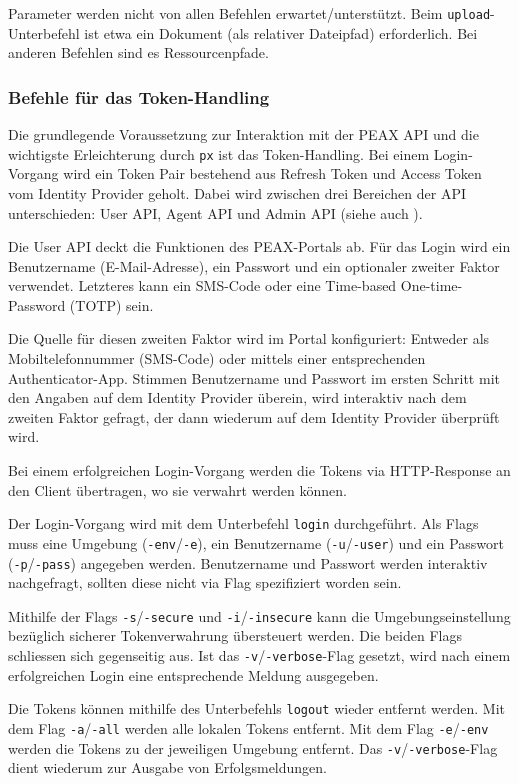 Parameter werden nicht von allen Befehlen erwartet/unterstützt. Beim \texttt{upload}-Unterbefehl ist etwa ein Dokument (als relativer Dateipfad) erforderlich. Bei anderen Befehlen sind es Ressourcenpfade.

\subsubsection{Befehle für das Token-Handling}

Die grundlegende Voraussetzung zur Interaktion mit der PEAX API und die wichtigste Erleichterung durch \texttt{px} ist das Token-Handling. Bei einem Login-Vorgang wird ein Token Pair bestehend aus Refresh Token und Access Token vom Identity Provider geholt. Dabei wird zwischen drei Bereichen der API unterschieden: User API, Agent API und Admin API (siehe auch ).

Die User API deckt die Funktionen des PEAX-Portals ab. Für das Login wird ein Benutzername (E-Mail-Adresse), ein Passwort und ein optionaler zweiter Faktor verwendet. Letzteres kann ein SMS-Code oder eine Time-based One-time-Password (TOTP) sein. 

Die Quelle für diesen zweiten Faktor wird im Portal konfiguriert: Entweder als Mobiltelefonnummer (SMS-Code) oder mittels einer entsprechenden Authenticator-App. Stimmen Benutzername und Passwort im ersten Schritt mit den Angaben auf dem Identity Provider überein, wird interaktiv nach dem zweiten Faktor gefragt, der dann wiederum auf dem Identity Provider überprüft wird. 

Bei einem erfolgreichen Login-Vorgang werden die Tokens via HTTP-Response an den Client übertragen, wo sie verwahrt werden können.

Der Login-Vorgang wird mit dem Unterbefehl \texttt{login} durchgeführt. Als Flags muss eine Umgebung (\texttt{-env}/\texttt{-e}), ein Benutzername (\texttt{-u}/\texttt{-user}) und ein Passwort (\texttt{-p}/\texttt{-pass}) angegeben werden. Benutzername und Passwort werden interaktiv nachgefragt, sollten diese nicht via Flag spezifiziert worden sein.

Mithilfe der Flags \texttt{-s}/\texttt{-secure} und \texttt{-i}/\texttt{-insecure} kann die Umgebungseinstellung bezüglich sicherer Tokenverwahrung übersteuert werden. Die beiden Flags schliessen sich gegenseitig aus. Ist das \texttt{-v}/\texttt{-verbose}-Flag gesetzt, wird nach einem erfolgreichen Login eine entsprechende Meldung ausgegeben.

Die Tokens können mithilfe des Unterbefehls \texttt{logout} wieder entfernt werden. Mit dem Flag \texttt{-a}/\texttt{-all} werden alle lokalen Tokens entfernt. Mit dem Flag \texttt{-e}/\texttt{-env} werden die Tokens zu der jeweiligen Umgebung entfernt. Das \texttt{-v}/\texttt{-verbose}-Flag dient wiederum zur Ausgabe von Erfolgsmeldungen.

